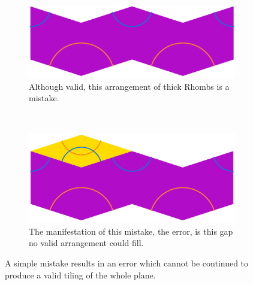 \documentclass[
  oneside,
  11pt, a4paper,
  footinclude=true,
  headinclude=true,
  cleardoublepage=empty
]{scrbook}
\begin{document}
\begin{figure}[h]
\centering
\begin{subfigure}{0.6\textwidth}
\includegraphics[width=\textwidth]{Mistake}
\caption{Although valid, this arrangement of thick Rhombs is a mistake.}
\label{fig:mistake}
\end{subfigure}\\
\begin{subfigure}{0.6\textwidth}
\includegraphics[width=\textwidth]{MistakeNext}
\caption{The manifestation of this mistake, the error, is this gap no valid arrangement could fill.}
\label{fig:error}
\end{subfigure}
\caption[A Simple Mistake]{A simple mistake results in an error which cannot be continued to produce a valid tiling of the whole plane.}
\label{fig:mistakes}
\end{figure}
\end{document}
